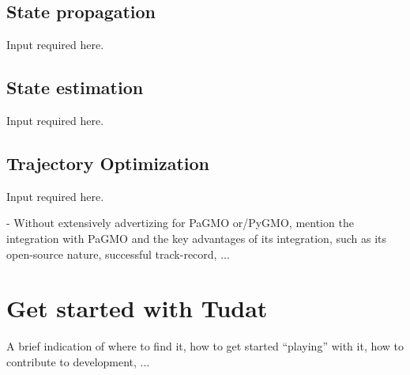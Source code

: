 \documentclass[]{IAC_style_updated}
\begin{document}
    \subsection{State propagation}
    \lbrack Input required here.\rbrack

    \subsection{State estimation}
    \lbrack Input required here.\rbrack

    \subsection{Trajectory Optimization}
    \lbrack Input required here.\rbrack
    
    - Without extensively advertizing for PaGMO \lbrack or/PyGMO\rbrack, mention the integration with PaGMO and the key advantages of its integration, such as its open-source nature, successful track-record, ...

\section{Get started with Tudat}
    A brief indication of where to find it, how to get started ``playing'' with it, how to contribute to development, ...
\end{document}
